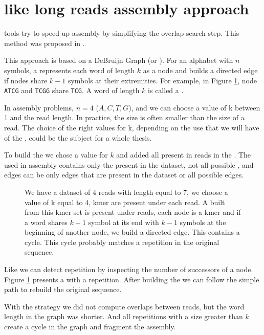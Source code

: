 \documentclass[main]{subfiles}
\begin{document}
\section{\DBG like long reads assembly approach} \label{section:sota:wtdbg}

\DBG tools try to speed up assembly by simplifying the overlap search step. This method was proposed in  \cite{eulerian_approach}.

This approach is based on a DeBruijn Graph (or \DBG). For an alphabet with $n$ symbols, a \DBG represents each word of length $k$ as a node and builds a directed edge if nodes share $k - 1$ symbols at their extremities. For example, in Figure \ref{intro:fig:dbg:graph}, node \texttt{ATCG} and \texttt{TCGG} share \texttt{TCG}. A word of length $k$ is called a \kmer.

In assembly problems, $n = 4$ (${A, C, T, G}$), and we can choose a value of k between 1 and the read length. In practice, the size is often smaller than the size of a read. The choice of the right values for k, depending on the use that we will have of the \DBG, could be the subject for a whole thesis.

To build the \DBG we chose a value for $k$ and added all \kmer present in reads in the \DBG. The \DBG used in assembly contains only the \kmer present in the dataset, not all possible \kmer, and edges can be only edges that are present in the dataset or all possible edges.

\begin{figure}[ht]
    \center
    
    \caption{We have a dataset of 4 reads with length equal to 7, we choose a value of k equal to 4, kmer are present under each read. A \DBG built from this kmer set is present under reads, each node is a kmer and if a word shares $k - 1$ symbol at its end with $k - 1$ symbols at the beginning of another node, we build a directed edge. This \DBG contains a cycle. This cycle probably matches a repetition in the original sequence.}
    \label{intro:fig:dbg:graph}
\end{figure}

Like \OLC we can detect repetition by inspecting the number of successors of a node. Figure \ref{intro:fig:dbg:graph} presents a \DBG with a repetition. After building the \DBG we can follow the simple path to rebuild the original sequence.

With the \DBG strategy we did not compute overlaps between reads, but the word length in the graph was shorter. And all repetitions with a size greater than $k$ create a cycle in the graph and fragment the assembly.
\end{document}
